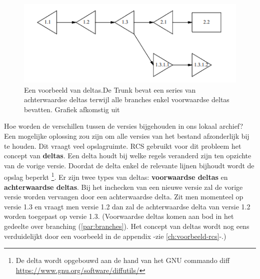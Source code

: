 \begin{figure}
\begin{center}
  	\includegraphics[scale=0.6]{deltas.png}
\end{center}
\caption[Voorbeeld van deltas.]{Een voorbeeld van deltas.De Trunk bevat een series van achterwaardse deltas terwijl alle branches enkel voorwaardse deltas bevatten. Grafiek afkomstig uit \textcite{Tichy85rcs}}\label{fig_deltas}
\end{figure}

Hoe worden de verschillen tussen de versies bijgehouden in ons lokaal archief? Een mogelijke oplossing zou zijn om alle versies van het bestand afzonderlijk bij te houden. Dit vraagt veel opslagruimte. RCS gebruikt voor dit probleem het concept van \textbf{deltas}. Een delta houdt bij welke regels veranderd zijn ten opzichte van de vorige versie. Doordat de delta enkel de relevante lijnen bijhoudt wordt de opslag beperkt \footnote{De delta wordt opgebouwd aan de hand van het GNU commando diff \url{https://www.gnu.org/software/diffutils/}}. Er zijn twee types van deltas: \textbf{voorwaardse deltas} en \textbf{achterwaardse deltas}. Bij het inchecken van een nieuwe versie zal de vorige versie worden vervangen door een achterwaardse delta. Zit men momenteel op versie 1.3 en  vraagt men versie 1.2 dan zal de achterwaardse delta van versie 1.2 worden toegepast op versie 1.3. (Voorwaardse deltas komen aan bod in het gedeelte over branching (\ref{par:branches}). Het concept van deltas wordt nog eens verduidelijkt door een voorbeeld in de appendix -zie \ref{ch:voorbeeld-rcs}-.)\\

